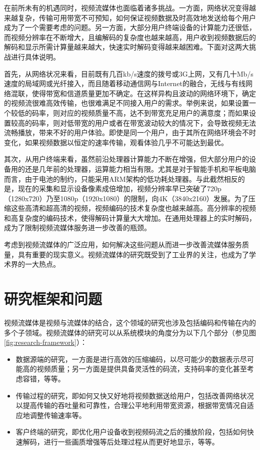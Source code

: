 在前所未有的机遇同时，视频流媒体也面临着诸多挑战。一方面，网络状况变得越来越复杂，传输可用带宽不可预知，如何保证视频数据及时高效地发送给每个用户成为了一个需要考虑的问题。另一方面，大部分用户终端设备的计算能力还很低，而视频分辨率在不断增大，且编解码的复杂度也越来越高，用户收到视频数据后的解码和显示所需计算量越来越大，快速实时解码变得越来越困难。下面对这两大挑战进行具体说明。

首先，从网络状况来看，目前既有几百kb/s速度的拨号或3G上网，又有几十Mb/s速度的局域网或光纤接入，而且随着移动通信网与Internet的融合，无线与有线网络混联，使得带宽和信道质量更加不确定。在这样异构且波动的网络环境下，确定的视频流很难高效传输，也很难满足不同接入用户的需求。举例来说，如果设置一个较低的码率，则对应的视频质量不高，达不到带宽充足用户的满意度；而如果设置较高的码率，则对低带宽的用户或者在带宽波动较大的情况下，会导致视频无法流畅播放，带来不好的用户体验。即使是同一个用户，由于其所在网络环境会不时变化，如果视频数据以恒定的速率传输，观看体验几乎不可能达到最优。

其次，从用户终端来看，虽然前沿处理器计算能力不断在增强，但大部分用户的设备用的还是几年前的处理器，运算能力相当有限。尤其是对于智能手机和平板电脑而言，由于电池的制约，只能采用ARM架构的低功耗处理器。与此截然相反的是，现在的采集和显示设备像素成倍增加，视频分辨率早已突破了720p（1280x720）乃至1080p（1920x1080）的限制，向4K（3840x2160）发展。为了压缩这些高清和超高清的视频，视频编码的技术复杂度也越来越高。高分辨率的视频和高复杂度的编码技术，使得解码计算量大大增加。在通用处理器上的实时解码，成为了限制视频流媒体服务进一步改善的瓶颈。

考虑到视频流媒体的广泛应用，如何解决这些问题从而进一步改善流媒体服务质量，具有重要的现实意义。视频流媒体的研究既受到了工业界的关注，也成为了学术界的一大热点。

\section{研究框架和问题}

视频流媒体是视频与流媒体的结合，这个领域的研究也涉及包括编码和传输在内的多个子领域。视频流媒体的研究可以从系统模块的角度分为以下几个部分（参见图\ref{fig:research-framework}）：

\begin{itemize}
	\item 数据源端的研究，一方面是进行高效的压缩编码，以尽可能少的数据表示尽可能高的视频质量；另一方面是提供具备灵活性的码流，支持码率的变化甚至考虑容错，等等。
	\item 传输过程的研究，即如何又快又好地将视频数据送给用户，包括改善网络状况以提高传输的吞吐量和可靠性，合理公平地利用带宽资源，根据带宽情况自适应地调整传输速率等。
	\item 客户终端的研究，即优化用户设备收到视频码流之后的播放阶段，包括如何快速解码，进行一些画质增强等后处理过程从而更好地显示，等等。
\end{itemize}

